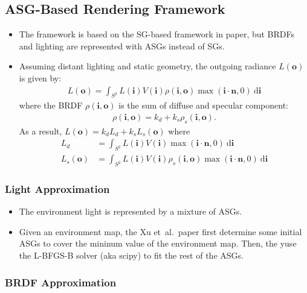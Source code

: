 \documentclass[10pt]{article}
\newcommand{\dee}{\mathrm{d}}
\newcommand{\ve}[1]{\mathbf{#1}}
\newcommand{\etal}{{et~al.}}
\begin{document}
  \subsection{ASG-Based Rendering Framework}

  \begin{itemize}
    \item The framework is based on the SG-based framework in \cite{Wang:2009} paper, but BRDFs and lighting are represented with ASGs instead of SGs.

    \item Assuming distant lighting and static geometry, the outgoing radiance $L(\ve{o})$ is given by:
    \begin{align*}
      L(\ve{o}) 
      = \int_{S^2} L(\ve{i}) V(\ve{i}) \rho(\ve{i}, \ve{o}) \max(\ve{i} \cdot \ve{n}, 0)\ \dee\ve{i}
    \end{align*}
    where the BRDF $\rho(\ve{i},\ve{o})$ is the sum of diffuse and specular component:
    \begin{align*}
      \rho(\ve{i},\ve{o}) = k_d + k_s \rho_s(\ve{i}, \ve{o}).
    \end{align*}
    As a result, $L(\ve{o}) = k_d L_d + k_s L_s(\ve{o})$ where
    \begin{align*}
      L_d &= \int_{S^2} L(\ve{i}) V(\ve{i}) \max(\ve{i} \cdot \ve{n}, 0)\ \dee\ve{i} \\
      L_s(\ve{o}) &= \int_{S^2} L(\ve{i}) V(\ve{i}) \rho_s(\ve{i},\ve{o})\max(\ve{i}\cdot\ve{n}, 0)\ \dee\ve{i}
    \end{align*}
  \end{itemize}

  \subsubsection{Light Approximation}

  \begin{itemize}
    \item The environment light is represented by a mixture of ASGs.

    \item Given an environment map, the Xu \etal\ paper first determine some initial ASGs to cover the mininum value of the environment map.  Then, the yuse the L-BFGS-B solver (aka scipy) to fit the rest of the ASGs.
  \end{itemize}

  \subsubsection{BRDF Approximation}
\end{document}
